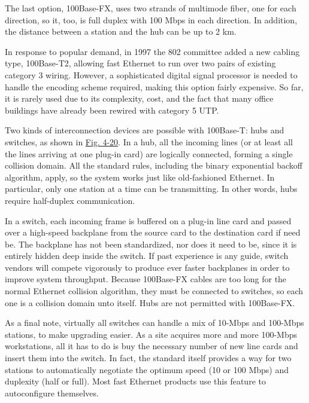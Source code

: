 The last option, {100Base-FX}, uses two strands of multimode fiber, one
for each direction, so it, too, is full duplex with 100 Mbps in each
direction. In addition, the distance between a station and the hub can
be up to 2 km.

In response to popular demand, in 1997 the 802 committee added a new
cabling type, 100Base-T2, allowing fast Ethernet to run over two pairs
of existing category 3 wiring. However, a sophisticated digital signal
processor is needed to handle the encoding scheme required, making this
option fairly expensive. So far, it is rarely used due to its
complexity, cost, and the fact that many office buildings have already
been rewired with category 5 UTP.

Two kinds of interconnection devices are possible with 100Base-T: hubs
and switches, as shown in
\protect\hyperlink{0130661023_ch04lev1sec3.htmlux5cux23ch04fig20}{Fig.
4-20}. In a hub, all the incoming lines (or at least all the lines
arriving at one plug-in card) are logically connected, forming a single
collision domain. All the standard rules, including the binary
exponential backoff algorithm, apply, so the system works just like
old-fashioned Ethernet. In particular, only one station at a time can be
transmitting. In other words, hubs require half-duplex communication.

In a switch, each incoming frame is buffered on a plug-in line card and
passed over a high-speed backplane from the source card to the
destination card if need be. The backplane has not been standardized,
nor does it need to be, since it is entirely hidden deep inside the
switch. If past experience is any guide, switch vendors will compete
vigorously to produce ever faster backplanes in order to improve system
throughput. Because 100Base-FX cables are too long for the normal
Ethernet collision algorithm, they must be connected to switches, so
each one is a collision domain unto itself. Hubs are not permitted with
100Base-FX.

As a final note, virtually all switches can handle a mix of 10-Mbps and
100-Mbps stations, to make upgrading easier. As a site acquires more and
more 100-Mbps workstations, all it has to do is buy the necessary number
of new line cards and insert them into the switch. In fact, the standard
itself provides a way for two stations to automatically negotiate the
optimum speed (10 or 100 Mbps) and duplexity (half or full). Most fast
Ethernet products use this feature to autoconfigure themselves.

\protect\hypertarget{0130661023_ch04lev1sec3.htmlux5cux23ch04lev2sec16}{}{}

